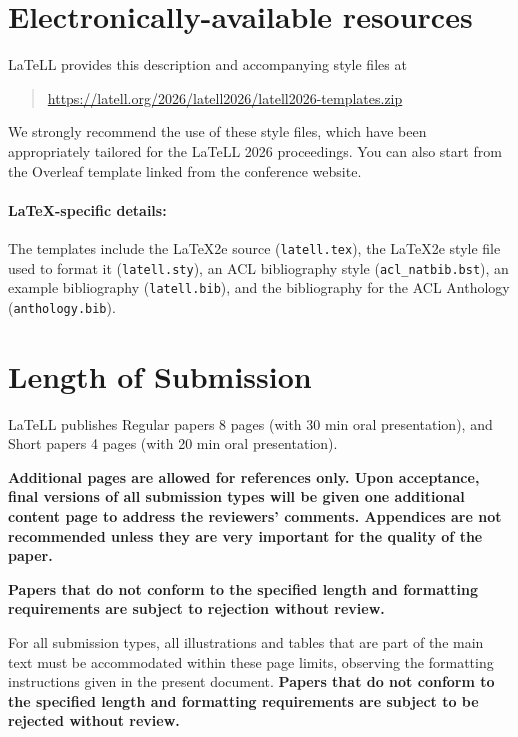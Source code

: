 \documentclass[11pt,a4paper]{article}
\begin{document}
\section{Electronically-available resources}

LaTeLL provides this description and accompanying style files at
\begin{quote}
\url{https://latell.org/2026/latell2026/latell2026-templates.zip}
\end{quote}
We strongly recommend the use of these style files, which have been appropriately tailored for the LaTeLL 2026 proceedings. You can also start from the Overleaf template linked from the conference website. 

\paragraph{\LaTeX-specific details:}
The templates include the \LaTeX2e{} source (\texttt{\small latell.tex}),
the \LaTeX2e{} style file used to format it (\texttt{\small latell.sty}),
an ACL bibliography style (\texttt{\small acl\_natbib.bst}),
an example bibliography (\texttt{\small latell.bib}),
and the bibliography for the ACL Anthology (\texttt{\small anthology.bib}).


\section{Length of Submission}
\label{sec:length}

LaTeLL publishes Regular papers 8 pages (with 30 min oral presentation), and Short papers 4 pages (with 20 min oral presentation).

\textbf{Additional pages are allowed for references only. Upon acceptance, final versions of all submission types will be given one additional content page to address the reviewers' comments. Appendices are not recommended unless they are very important for the quality of the paper.}

\textbf{Papers that do not conform to the specified length and formatting requirements are subject to rejection without review.}

For all submission types, all illustrations and tables that are part of the main text must be accommodated within these page limits, observing the formatting instructions given in the present document. 
\textbf{Papers that do not conform to the specified length and formatting requirements are subject to be rejected without review.}
\end{document}
